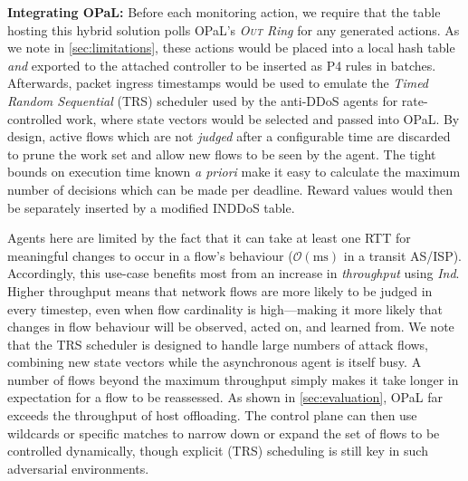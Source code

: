 \documentclass[
sigconf,natbib=false
,anonymous=true
,10pt
]{acmart}
\newcommand{\fakepara}[1]{\noindent\textbf{#1:}}
\newcommand{\approachshort}{OPaL}
\newcommand{\Coopfw}{\emph{CoOp}}
\newcommand{\Indfw}{\emph{Ind}}
\newcommand{\outring}{\textsc{Out}}
\begin{document}
\fakepara{Integrating \approachshort}
Before each monitoring action, we require that the table hosting this hybrid solution polls \approachshort{}'s \emph{\outring{} Ring} for any generated actions.
As we note in \cref{sec:limitations}, these actions would be placed into a local hash table \emph{and} exported to the attached controller to be inserted as P4 rules in batches.
Afterwards, packet ingress timestamps would be used to emulate the \emph{Timed Random Sequential} (TRS) scheduler used by the anti-DDoS agents for rate-controlled work, where state vectors would be selected and passed into \approachshort.
By design, active flows which are not \emph{judged} after a configurable time are discarded to prune the work set and allow new flows to be seen by the agent.
The tight bounds on execution time known \emph{a priori} make it easy to calculate the maximum number of decisions which can be made per deadline.
Reward values would then be separately inserted by a modified INDDoS table.


Agents here are limited by the fact that it can take at least one RTT for meaningful changes to occur in a flow's behaviour ($\mathcal{O}{\left(\si{\milli\second}\right)}$ in a transit AS/ISP).
Accordingly, this use-case benefits most from an increase in \emph{throughput} using \Indfw{}.
Higher throughput means that network flows are more likely to be judged in every timestep, even when flow cardinality is high---making it more likely that changes in flow behaviour will be observed, acted on, and learned from.
We note that the TRS scheduler is designed to handle large numbers of attack flows, combining new state vectors while the asynchronous agent is itself busy.
A number of flows beyond the maximum throughput simply makes it take longer in expectation for a flow to be reassessed.
As shown in \cref{sec:evaluation}, \approachshort{} far exceeds the throughput of host offloading.
The control plane can then use wildcards or specific matches to narrow down or expand the set of flows to be controlled dynamically, though explicit (TRS) scheduling is still key in such adversarial environments.

\end{document}
